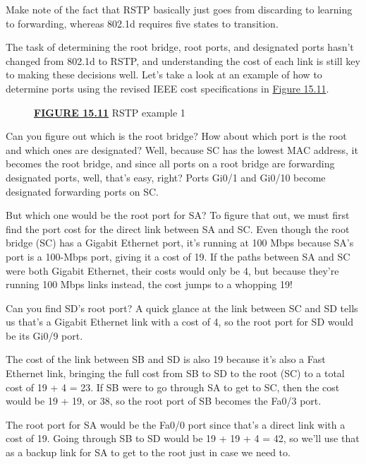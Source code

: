 Make note of the fact that RSTP basically just goes from discarding to
learning to forwarding, whereas 802.1d requires five states to
transition.

The task of determining the root bridge, root ports, and designated
ports hasn't changed from 802.1d to RSTP, and understanding the cost of
each link is still key to making these decisions well. Let's take a look
at an example of how to determine ports using the revised IEEE cost
specifications in
\protect\hyperlink{c15.xhtmlux5cux23figure15-11}{Figure 15.11}.

\begin{figure}
\centering
\caption{{\protect\hyperlink{c15.xhtmlux5cux23figureanchor15-11}{\textbf{FIGURE
15.11}} RSTP example 1}}
\end{figure}

Can you figure out which is the root bridge? How about which port is the
root and which ones are designated? Well, because SC has the lowest MAC
address, it becomes the root bridge, and since all ports on a root
bridge are forwarding designated ports, well, that's easy, right? Ports
Gi0/1 and Gi0/10 become designated forwarding ports on SC.

But which one would be the root port for SA? To figure that out, we must
first find the port cost for the direct link between SA and SC. Even
though the root bridge (SC) has a Gigabit Ethernet port, it's running at
100 Mbps because SA's port is a 100-Mbps port, giving it a cost of 19.
If the paths between SA and SC were both Gigabit Ethernet, their
costs would only be
4, but because they're running 100 Mbps links instead, the cost jumps to
a whopping 19!

Can you find SD's root port? A quick glance at the link between SC and
SD tells us that's a Gigabit Ethernet link with a cost of 4, so the root
port for SD would be its Gi0/9 port.

The cost of the link between SB and SD is also 19 because it's also a
Fast Ethernet link, bringing the full cost from SB to SD to the root
(SC) to a total cost of 19 + 4 = 23. If SB were to go through SA to get
to SC, then the cost would be 19 + 19, or 38, so the root port of SB
becomes the Fa0/3 port.

The root port for SA would be the Fa0/0 port since that's a direct link
with a cost of 19. Going through SB to SD would be 19 + 19 + 4 = 42, so
we'll use that as a backup link for SA to get to the root just in case
we need to.

